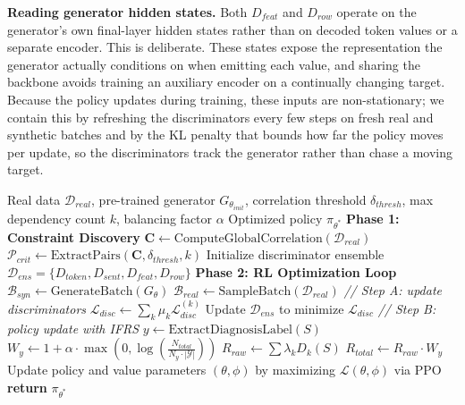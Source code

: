\noindent\textbf{Reading generator hidden states.} Both $D_{feat}$ and $D_{row}$ operate on the generator's own final-layer hidden states rather than on decoded token values or a separate encoder. This is deliberate. These states expose the representation the generator actually conditions on when emitting each value, and sharing the backbone avoids training an auxiliary encoder on a continually changing target. Because the policy updates during training, these inputs are non-stationary; we contain this by refreshing the discriminators every few steps on fresh real and synthetic batches and by the KL penalty that bounds how far the policy moves per update, so the discriminators track the generator rather than chase a moving target.


\begin{algorithm}[t]
\footnotesize
\captionsetup{font=footnotesize}
\caption{DISCO-TAB Training Procedure for Clinical Data}
\label{alg:discotab}
\begin{algorithmic}[1] %
\REQUIRE Real data $\mathcal{D}_{real}$, pre-trained generator $G_{\theta_{init}}$, correlation threshold $\delta_{thresh}$, max dependency count $k$, balancing factor $\alpha$
\ENSURE Optimized policy $\pi_{\theta^*}$
\STATE \textbf{Phase 1: Constraint Discovery}
\STATE $\mathbf{C} \gets \text{ComputeGlobalCorrelation}(\mathcal{D}_{real})$
\STATE $\mathcal{P}_{crit} \gets \text{ExtractPairs}(\mathbf{C}, \delta_{thresh}, k)$ 
\STATE Initialize discriminator ensemble $\mathcal{D}_{ens} = \{D_{token}, D_{sent}, D_{feat}, D_{row}\}$
\STATE \textbf{Phase 2: RL Optimization Loop}
    \STATE $\mathcal{B}_{syn} \gets \text{GenerateBatch}(G_{\theta})$
    \STATE $\mathcal{B}_{real} \gets \text{SampleBatch}(\mathcal{D}_{real})$
    \STATE \textit{// Step A: update discriminators}
    \STATE $\mathcal{L}_{disc} \gets \sum_k \mu_k \mathcal{L}_{disc}^{(k)}$
    \STATE Update $\mathcal{D}_{ens}$ to minimize $\mathcal{L}_{disc}$
    \STATE \textit{// Step B: policy update with IFRS}
        \STATE $y \gets \text{ExtractDiagnosisLabel}(S)$
        \STATE $W_{y} \gets 1 + \alpha \cdot \max(0, \log(\frac{N_{total}}{N_y \cdot |\mathcal{Y}|}))$ 
        \STATE $R_{raw} \gets \sum \lambda_k D_k(S)$
        \STATE $R_{total} \gets R_{raw} \cdot W_{y}$ 
    \ENDFOR
    \STATE Update policy and value parameters $(\theta,\phi)$ by maximizing $\mathcal{L}(\theta,\phi)$ via PPO
\ENDFOR
\STATE \textbf{return} $\pi_{\theta^*}$
\end{algorithmic}
\end{algorithm}










